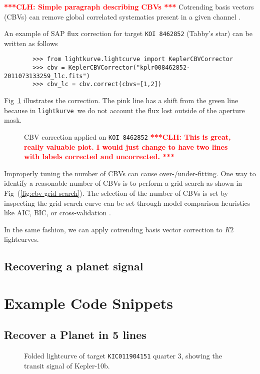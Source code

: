 \documentclass[twocolumn]{aastex62}
\newcommand{\ktwo}{{\it K$\mathit{2}$}}
\newcommand{\lightkurve}{\texttt{lightkurve}}
\newcommand{\clh}[1]{\textcolor{red}{ \textbf{***CLH: #1 ***}}}
\begin{document}
        \clh{Simple paragraph describing CBVs}
        Cotrending basis vectors (CBVs) can remove global correlated
        systematics present in a given channel \cite{smith2012}.

        An example of SAP flux correction for target \texttt{KOI 8462852}
        (Tabby's star) can be written as follows
        \begin{verbatim}
        >>> from lightkurve.lightcurve import KeplerCBVCorrector
        >>> cbv = KeplerCBVCorrector("kplr008462852-2011073133259_llc.fits")
        >>> cbv_lc = cbv.correct(cbvs=[1,2])
        \end{verbatim}

        Fig~\ref{fig:cbv-correction} illustrates the correction. The pink line has a shift from
        the green line because in \lightkurve~we do not account the flux lost outside of the aperture mask.

        \begin{figure}[!htb]
            \centering
            \caption{CBV correction applied on \texttt{KOI 8462852}
            \clh{This is great, really valuable plot. I would just change to have two lines with labels corrected and uncorrected.}}
            \label{fig:cbv-correction}
        \end{figure}


        Improperly tuning the number of CBVs can cause over-/under-fitting. One
        way to identify a reasonable number of CBVs is to perform a grid search
        as shown in Fig~(\ref{fig:cbv-grid-search}). The selection of the number of CBVs is set by inspecting the
        grid search curve can be set through model comparison heuristics like AIC, BIC,
        or cross-validation \cite{ivezi2014}.

        In the same fashion, we can apply cotrending basis vector correction to
        \ktwo lightcurves.


\subsection{Recovering a planet signal}




\section{Example Code Snippets}

\subsection{Recover a Planet in 5 lines}
\begin{figure}
\caption{Folded lightcurve of target \texttt{KIC011904151} quarter 3, showing the
            transit signal of Kepler-10b.
\label{fig:fold-method}}
\end{figure}
\end{document}

